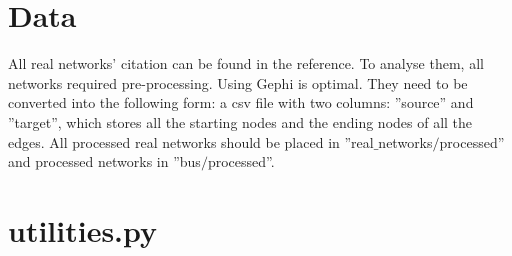 \documentclass[12pt]{article}
\begin{document}
\appendix
\section{Data}
All real networks' citation can be found in the reference. To analyse them, all networks required pre-processing. Using Gephi is optimal. They need to be converted into the following form: a csv file with two columns: ''source'' and ''target'', which stores all the starting nodes and the ending nodes of all the edges. All processed real networks should be placed in ''real$\_$networks$/$processed'' and processed networks in ''bus$/$processed''.

\section{utilities.py}
\label{utilities_code}
\end{document}
